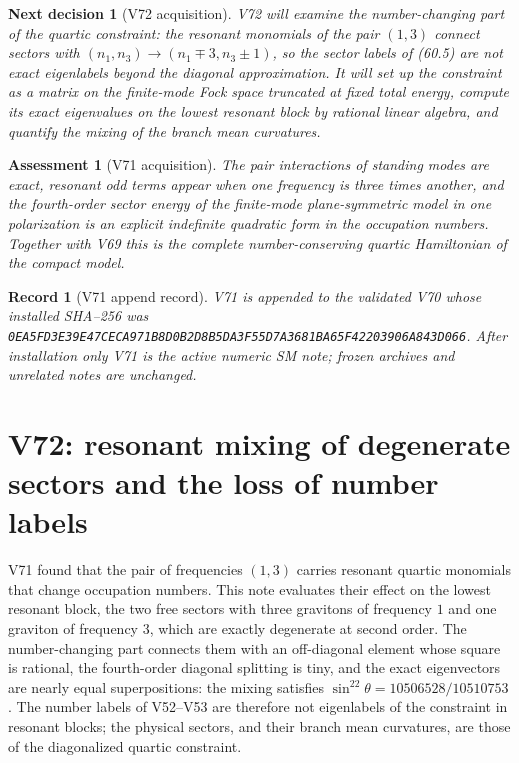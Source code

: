 \documentclass[11pt]{article}
\newtheorem{decision}[theorem]{Next decision}
\newtheorem{assessment}[theorem]{Assessment}
\newtheorem{record}[theorem]{Record}
\theoremstyle{remark}
\begin{document}
\begin{decision}[V72 acquisition]
\label{dec:v19v71-next}
V72 will examine the number-changing part of the quartic constraint:
the resonant monomials of the pair \((1,3)\) connect sectors with
\((n_1,n_3)\to(n_1\mp3,n_3\pm1)\), so the sector labels of (60.5) are
not exact eigenlabels beyond the diagonal approximation.  It will set
up the constraint as a matrix on the finite-mode Fock space truncated
at fixed total energy, compute its exact eigenvalues on the lowest
resonant block by rational linear algebra, and quantify the mixing of
the branch mean curvatures.
\end{decision}

\begin{assessment}[V71 acquisition]
\label{ass:v19v71}
The pair interactions of standing modes are exact, resonant odd terms
appear when one frequency is three times another, and the fourth-order
sector energy of the finite-mode plane-symmetric model in one
polarization is an explicit indefinite quadratic form in the
occupation numbers.  Together with V69 this is the complete
number-conserving quartic Hamiltonian of the compact model.
\end{assessment}

\begin{record}[V71 append record]
\label{rec:v19v71}
V71 is appended to the validated V70 whose installed SHA--256 was
\texttt{0EA5FD3E39E47CECA971B8D0B2D8B5DA3F55D7A3681BA65F42203906A843D066}.
After installation only V71 is the active numeric SM note; frozen
archives and unrelated notes are unchanged.
\end{record}


\section{V72: resonant mixing of degenerate sectors and the loss of number labels}
\label{sec:v19v72}

V71 found that the pair of frequencies \((1,3)\) carries resonant
quartic monomials that change occupation numbers.  This note evaluates
their effect on the lowest resonant block, the two free sectors with
three gravitons of frequency \(1\) and one graviton of frequency \(3\),
which are exactly degenerate at second order.  The number-changing
part connects them with an off-diagonal element whose square is
rational, the fourth-order diagonal splitting is tiny, and the exact
eigenvectors are nearly equal superpositions: the mixing satisfies
\(\sin^22\theta=10506528/10510753\).  The number labels of V52--V53
are therefore not eigenlabels of the constraint in resonant blocks; the
physical sectors, and their branch mean curvatures, are those of the
diagonalized quartic constraint.
\end{document}
